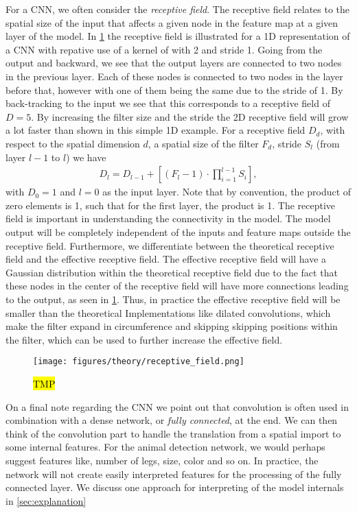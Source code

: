 For a \acrshort{CNN}, we often consider the \textit{receptive field}. The
receptive field relates to the spatial size of the input that affects a given
node in the feature map at a given layer of the model. In
\cref{fig:receptive_field} the receptive field is illustrated for a 1D
representation of a \acrshort{CNN} with repative use of a kernel of with 2 and  stride 1. Going from the output and backward, we see that the output layers are connected to two nodes in the previous layer. Each of these nodes is connected to two nodes in the layer before that, however with one of them being the same due to the stride of 1. By back-tracking to the input we see that this
corresponds to a receptive field of $D = 5$. By increasing the filter size and
the stride the 2D receptive field will grow a lot faster than shown in this
simple 1D example. For a receptive field $D_d$, with respect to the spatial dimension $d$, a
spatial size of the filter $F_d$, stride $S_l$ (from layer $l-1$ to $l$) we have
\begin{align*}
    D_l = D_{l-1} + \left[(F_l - 1) \cdot \prod_{i=1}^{l-1}S_i \right],
\end{align*}
with $D_0 = 1$ and $l=0$ as the input layer. Note that by convention, the
product of zero elements is 1, such that for the first layer, the product is 1. The receptive field is important in understanding the connectivity in the model. The model output will be completely independent of the inputs and feature maps outside the receptive field. Furthermore, we differentiate between the theoretical
receptive field and the effective receptive field. The effective receptive field
will have a Gaussian distribution within the theoretical receptive field due to the fact that these nodes in the center of the receptive field will have more connections leading to the output, as seen in \cref{fig:receptive_field}. Thus, in practice the effective receptive field will be smaller than the theoretical Implementations like dilated convolutions, which make the filter expand in circumference and skipping skipping positions within the filter, which can be used to further increase the effective field. 

\begin{figure}[H]
  \centering
  \texttt{[image: figures/theory/receptive\_field.png]}
  \caption{\hl{TMP}}
  \label{fig:receptive_field}
\end{figure}


On a final note regarding the \acrshort{CNN} we point out that convolution is often used in combination with a dense network, or \textit{fully connected}, at the end. We can then think of the convolution part to handle the translation from a spatial import to some internal features. For the animal detection network, we would perhaps suggest features like, number of legs, size, color and so on. In practice, the network will not create easily interpreted features for the processing of the fully connected layer. We discuss one approach for interpreting of the model internals in \cref{sec:explanation}

